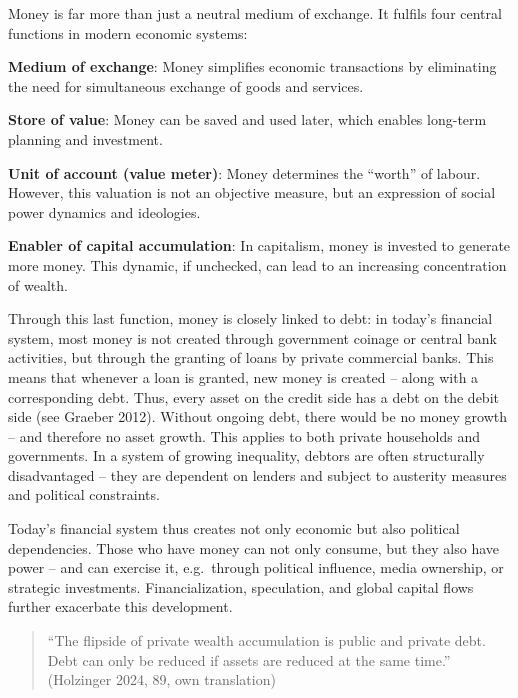 \documentclass[
  a4paper,
  DIV=11,
  numbers=noendperiod,
  oneside,
  openany]{scrreprt}
\begin{document}
\begin{tcolorbox}[enhanced jigsaw, arc=.35mm, bottomrule=.15mm, bottomtitle=1mm, breakable, colback=white, colbacktitle=quarto-callout-note-color!10!white, colframe=quarto-callout-note-color-frame, coltitle=black, left=2mm, leftrule=.75mm, opacityback=0, opacitybacktitle=0.6, rightrule=.15mm, title={What we need to understand about money and debt}, titlerule=0mm, toprule=.15mm, toptitle=1mm]

Money is far more than just a neutral medium of exchange. It fulfils
four central functions in modern economic systems:

\textbf{Medium of exchange}: Money simplifies economic transactions by
eliminating the need for simultaneous exchange of goods and services.

\textbf{Store of value}: Money can be saved and used later, which
enables long-term planning and investment.

\textbf{Unit of account (value meter)}: Money determines the ``worth''
of labour. However, this valuation is not an objective measure, but an
expression of social power dynamics and ideologies.

\textbf{Enabler of capital accumulation}: In capitalism, money is
invested to generate more money. This dynamic, if unchecked, can lead to
an increasing concentration of wealth.

Through this last function, money is closely linked to debt: in today's
financial system, most money is not created through government coinage
or central bank activities, but through the granting of loans by private
commercial banks. This means that whenever a loan is granted, new money
is created -- along with a corresponding debt. Thus, every asset on the
credit side has a debt on the debit side (see Graeber 2012). Without
ongoing debt, there would be no money growth -- and therefore no asset
growth. This applies to both private households and governments. In a
system of growing inequality, debtors are often structurally
disadvantaged -- they are dependent on lenders and subject to austerity
measures and political constraints.

Today's financial system thus creates not only economic but also
political dependencies. Those who have money can not only consume, but
they also have power -- and can exercise it, e.g.~through political
influence, media ownership, or strategic investments. Financialization,
speculation, and global capital flows further exacerbate this
development.

\begin{quote}
``The flipside of private wealth accumulation is public and private
debt. Debt can only be reduced if assets are reduced at the same time.''
(Holzinger 2024, 89, own translation)
\end{quote}

\end{tcolorbox}
\end{document}
